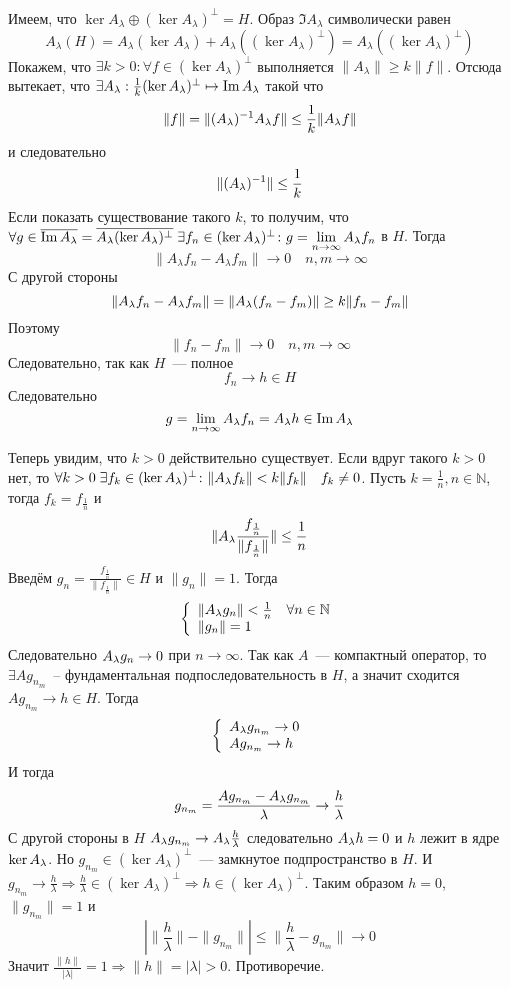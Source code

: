 \documentclass[14pt]{extarticle}
\begin{document}
\begin{Proof}
    Имеем, что $\ker A_\lambda \oplus (\ker A_\lambda)^\perp = H$.
    Образ $\Im A_\lambda$ символически равен
    $$
    A_\lambda(H) = A_\lambda(\ker A_\lambda) + A_\lambda((\ker A_\lambda)^
    \perp) = A_\lambda((\ker A_\lambda)^\perp)
    $$
    Покажем, что $\exists k > 0\colon \forall f \in (\ker A_\lambda)^\perp$
    выполняется $\|A_\lambda\| \ge k \|f\|$.
    Отсюда вытекает, что $\exists A_\lambda : \frac{1}{k}(\ker A_\lambda)^\perp 
    \mapsto \operatorname{Im} 
    A_\lambda$ такой что
    $$
    \|f\| = \|(A_\lambda)^{-1} A_\lambda f\| \le \frac{1}{k}\|A_\lambda f\|
    $$
    и следовательно
    $$
    \|(A_\lambda)^{-1}\| \le \frac{1}{k}
    $$
    Если показать существование такого $k$, то получим, что $\forall g \in 
    \overline{\operatorname{Im} A_\lambda} = \overline{A_\lambda (\ker A_\lambda)^\perp}\; \exists f_n
    \in (\ker A_\lambda)^\perp\colon g = \lim\limits_{n \to \infty}A_\lambda f_n$ в
    $H$.
    Тогда
    $$
    \|A_\lambda f_n - A_\lambda f_m\| \to 0 \quad n,m \to \infty
    $$
    С другой стороны
    $$
    \|A_\lambda f_n - A_\lambda f_m\| = \| A_\lambda (f_n - f_m)\| \ge k \|f_n - f_m\|
    $$
    Поэтому
    $$
    \|f_n - f_m\| \to 0 \quad n,m \to \infty
    $$
    Следовательно, так как $H$~--- полное
    $$
    f_n \to h \in H
    $$
    Следовательно
    $$
    g = \lim_{n \to \infty}A_\lambda f_n = A_\lambda h \in \operatorname{Im} A_\lambda
    $$
    
    Теперь увидим, что $k > 0$ действительно существует.
    Если вдруг такого $k > 0$ нет, то
    $\forall k > 0\; \exists f_k \in (\ker A_\lambda)^\perp\colon \|A_\lambda f_k\| 
    < k \|f_k\|\quad f_k \ne 0$.
    Пусть $k = \frac{1}{n}, n \in \mathbb N$, тогда $f_k = f_{\frac{1}{n}}$ и
    $$
    \|A_\lambda \frac{f_{\frac{1}{n}}}{\|f_{\frac{1}{n}}\|}\| \le \frac{1}{n}
    $$
    Введём $g_n = \frac{f_{\frac{1}{n}}}{\|f_{\frac{1}{n}}\|} \in H$ и $\|g_n
    \| = 1$.
    Тогда
    $$
    \left\{
        \begin{array}{l}
            \|A_\lambda g_n\| < \frac{1}{n} \quad \forall n \in \mathbb N\\
            \|g_n\| = 1
        \end{array}
    \right.
    $$
    Следовательно $A_\lambda g_n \to 0$ при $n \to \infty$.
    Так как $A$~--- компактный оператор, то $\exists A g_{n_m}$~--
    фундаментальная подпоследовательность в $H$, а значит сходится $Ag_{n_m}
    \to h \in H$.
    Тогда
    $$
    \left\{
        \begin{array}{l}
            A_\lambda g_{n_m} \to 0\\
            A g_{n_m} \to h
        \end{array}
    \right.
    $$
    И тогда
    $$
    g_{n_m} = \frac{A g_{n_m} - A_\lambda g_{n_m}}{\lambda} \to \frac{h}{\lambda}
    $$
    С другой стороны в $H$ $A_\lambda g_{n_m} \to A_\lambda \frac{h}{\lambda}$ 
    следовательно $A_\lambda h = 0$ и $h$ лежит в ядре $\ker A_\lambda$.
    Но $g_{n_m} \in (\ker A_\lambda)^\perp$~--- замкнутое подпространство в 
    $H$.
    И $g_{n_m} \to \frac{h}{\lambda} \Rightarrow \frac{h}{\lambda} \in 
    (\ker A_\lambda)^\perp \Rightarrow h \in (\ker A_\lambda)^\perp$.
    Таким образом $h = 0$, $\|g_{n_m}\| = 1$ и
    $$
    |\|\frac{h}{\lambda}\| - \|g_{n_m}\|| \le \|\frac{h}{\lambda} - g_{n_m}\|
    \to 0
    $$
    Значит $\frac{\|h\|}{|\lambda|} = 1 \Rightarrow  \|h\| = |\lambda| > 0$.
    Противоречие.
\end{Proof}
\end{document}
